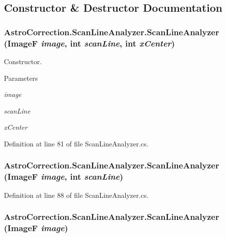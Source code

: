 \subsection{Constructor \& Destructor Documentation}
\subsubsection[{ScanLineAnalyzer}]{\setlength{\rightskip}{0pt plus 5cm}AstroCorrection.ScanLineAnalyzer.ScanLineAnalyzer ({\bf ImageF} {\em image}, \/  int {\em scanLine}, \/  int {\em xCenter})}\label{class_astro_correction_1_1_scan_line_analyzer_a68be7616e111fe6dfe4e51dcff8bd282}


Constructor. 
\begin{DoxyParams}{Parameters}
\item[{\em image}]\item[{\em scanLine}]\item[{\em xCenter}]\end{DoxyParams}


Definition at line 81 of file ScanLineAnalyzer.cs.
\subsubsection[{ScanLineAnalyzer}]{\setlength{\rightskip}{0pt plus 5cm}AstroCorrection.ScanLineAnalyzer.ScanLineAnalyzer ({\bf ImageF} {\em image}, \/  int {\em scanLine})}\label{class_astro_correction_1_1_scan_line_analyzer_a244e89c43f71842f56190f1226b4df2b}


Definition at line 88 of file ScanLineAnalyzer.cs.
\subsubsection[{ScanLineAnalyzer}]{\setlength{\rightskip}{0pt plus 5cm}AstroCorrection.ScanLineAnalyzer.ScanLineAnalyzer ({\bf ImageF} {\em image})}\label{class_astro_correction_1_1_scan_line_analyzer_a17ebcdc7b7d69ce60e32df2d55c9ba01}


